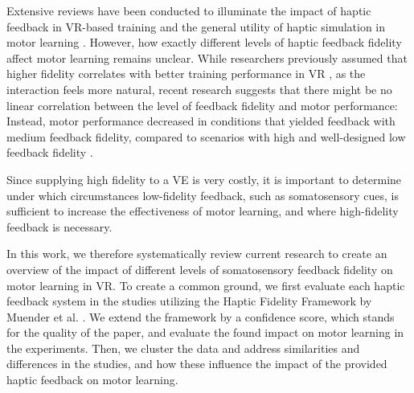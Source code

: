 Extensive reviews have been conducted to illuminate the impact of haptic feedback in VR-based training \cite{Sigrist2013AugmentedReview} and the general utility of haptic simulation in motor learning \cite{Al-Saud2021TheReview}. However, how exactly different levels of haptic feedback fidelity affect motor learning remains unclear.
While researchers previously assumed that higher fidelity correlates with better training performance in VR \cite{Caird1996PersistentTraining, Waller1998TheTraining}, as the interaction feels more natural, recent research suggests that there might be no linear correlation between the level of feedback fidelity and motor performance: Instead, motor performance decreased in conditions that yielded feedback with medium feedback fidelity, compared to scenarios with high and well-designed low feedback fidelity \cite{MahdiNabiyouni201520153DUI.}.

Since supplying high fidelity to a VE is very costly, it is important to determine under which circumstances low-fidelity feedback, such as somatosensory cues, is sufficient to increase the effectiveness of motor learning, and where high-fidelity feedback is necessary. 

In this work, we therefore systematically review current research to create an overview of the impact of different levels of somatosensory feedback fidelity on motor learning in VR. To create a common ground, we first evaluate each haptic feedback system in the studies utilizing the Haptic Fidelity Framework by Muender et al. \cite{Muender2022HapticReality}. We extend the framework by a confidence score, which stands for the quality of the paper, and evaluate the found impact on motor learning in the experiments. Then, we cluster the data and address similarities and differences in the studies, and how these influence the impact of the provided haptic feedback on motor learning. 

